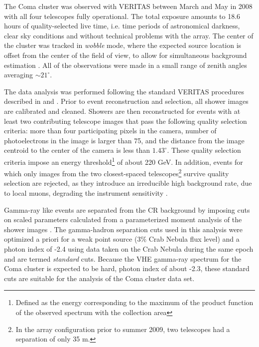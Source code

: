 \documentclass[12pt,manuscript]{aastex}
\begin{document}
The Coma cluster was observed with VERITAS between March and May in 2008 with all four telescopes fully operational. The total exposure amounts to 18.6 hours of quality-selected live time, i.e. time periods of astronomical darkness, clear sky conditions and without technical problems with the array. The center of the cluster was tracked in \emph{wobble} mode, where the expected source location is offset from the center of the field of view, to allow for simultaneous background estimation \citep{article:Formin_etal:1994}. All of the observations were made in a small range of zenith angles averaging $\sim 21^{\circ}$.

The data analysis was performed following the standard VERITAS procedures described in \citet{inproc:Cogan_etal:2007} and \citet{inproc:Daniel_etal:2007}. Prior to event reconstruction and selection, all shower images are calibrated and cleaned. Showers are then reconstructed for events with at least two contributing telescope images that pass the following quality selection criteria: more than four participating pixels in the camera, number of photoelectrons in the image is larger than 75, and the distance from the image centroid to the center of the camera is less than $1.43^{\circ}$. These quality selection criteria impose an energy threshold\footnote{Defined as the energy corresponding to the maximum of the product function of the observed spectrum with the collection area} of about 220 GeV. In addition, events for which only images from the two closest-spaced telescopes\footnote{In the array configuration prior to summer 2009, two telescopes had a separation of only 35 m.} survive quality selection are rejected, as they introduce an irreducible high background rate, due to local muons, degrading the instrument sensitivity \citep{article:MaierKnapp:2007}.

Gamma-ray like events are separated from the CR background by imposing cuts on scaled parameters \citep{article:Aharonian_etal:1997, article:Krawczynski_etal:2006} calculated from a parameterized moment analysis of the shower images \citep{inproc:Hillas:1985}. The gamma-hadron separation cuts used in this analysis were optimized a priori for a weak point source (3\% Crab Nebula flux level) and a photon index of -2.4 using data taken on the Crab Nebula during the same epoch and are termed \emph{standard} cuts. Because the VHE gamma-ray spectrum for the Coma cluster is expected to be hard, photon index of about -2.3, these standard cuts are suitable for the analysis of the Coma cluster data set. 
\end{document}
